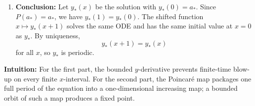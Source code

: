 \begin{solution}
\begin{enumerate}
    \item \textbf{Conclusion:} Let $y_*(x)$ be the solution with $y_*(0)=a_*$. Since $P(a_*)=a_*$, we have $y_*(1)=y_*(0)$. The shifted function $x\mapsto y_*(x+1)$ solves the same ODE and has the same initial value at $x=0$ as $y_*$. By uniqueness,
    \[
    y_*(x+1)=y_*(x)
    \]
    for all $x$, so $y_*$ is periodic.
\end{enumerate}

\textbf{Intuition:}
For the first part, the bounded $y$-derivative prevents finite-time blow-up on every finite $x$-interval. For the second part, the Poincaré map packages one full period of the equation into a one-dimensional increasing map; a bounded orbit of such a map produces a fixed point.
\end{solution}
